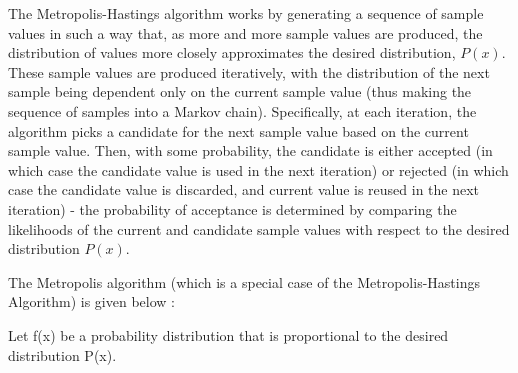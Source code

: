 \documentclass[11pt]{article}
\numberwithin{equation}{section}
\begin{document}
The Metropolis-Hastings algorithm works by generating a sequence of sample values in such a way that, as more and more sample values are produced, the distribution of values more closely approximates the desired distribution, $P\left(x\right)$. These sample values are produced iteratively, with the distribution of the next sample being dependent only on the current sample value (thus making the sequence of samples into a Markov chain). Specifically, at each iteration, the algorithm picks a candidate for the next sample value based on the current sample value. Then, with some probability, the candidate is either accepted (in which case the candidate value is used in the next iteration) or rejected (in which case the candidate value is discarded, and current value is reused in the next iteration) - the probability of acceptance is determined by comparing the likelihoods of the current and candidate sample values with respect to the desired distribution $P\left(x\right)$. \medskip

The Metropolis algorithm (which is a special case of the Metropolis-Hastings Algorithm) is given below : \medskip

Let f(x) be a probability distribution that is proportional to the desired distribution P(x).
\end{document}
